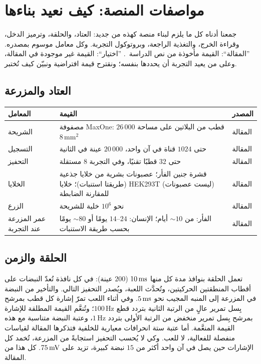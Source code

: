 \section{مواصفات المنصة: كيف نعيد بناءها}
\label{sec:dishspec}

جمعنا أدناه كل ما يلزم لبناء منصة كهذه من جديد: العتاد، والحلقة، وترميز الدخل، وقراءة الخرج، والتغذية الراجعة، وبروتوكول التجربة. وكل معامل موسوم بمصدره. ”المقالة“: القيمة مأخوذة من نص الدراسة~\cite{Kagan2022}. ”اختيار“: القيمة غير موجودة في المقالة، وعلى من يعيد التجربة أن يحددها بنفسه؛ ونقترح قيمة افتراضية ونبيّن كيف تُختبر.

\subsection*{العتاد والمزرعة}

\begin{center}
\footnotesize
\setlength{\tabcolsep}{4pt}
\renewcommand{\arraystretch}{1.15}
\begin{tabular}{>{\raggedright}p{4.0cm}>{\raggedright}p{6.9cm}>{\raggedright\arraybackslash}p{1.6cm}}
\toprule
المعامل & القيمة & المصدر \\
\midrule
الشريحة & مصفوفة \foreignlanguage{english}{MaxOne}: $26\,000$ قطب من البلاتين على مساحة $8\,\text{mm}^2$ & المقالة \\
التسجيل & حتى $1024$ قناة في آن واحد، $20\,000$ عينة في الثانية & المقالة \\
التحفيز & حتى $32$ قطبًا تقنيًا، وفي التجربة $8$ مستقلة & المقالة \\
الخلايا & قشرة جنين الفأر؛ عصبونات بشرية من خلايا جذعية (طريقتا استنبات)؛ خلايا \foreignlanguage{english}{HEK293T} (ليست عصبونات) للمقارنة الضابطة & المقالة \\
الزرع & نحو $10^6$ خلية للشريحة & المقالة \\
عمر المزرعة عند التجربة & الفأر: من $\sim10$ أيام؛ الإنسان: $14\text{--}24$ يومًا أو $\sim80$ يومًا بحسب طريقة الاستنبات & المقالة \\
\bottomrule
\end{tabular}
\end{center}

\subsection*{الحلقة والزمن}

تعمل الحلقة بنوافذ مدة كل منها $10\,\text{ms}$ ($200$ عينة): في كل نافذة تُعدّ النبضات على أقطاب المنطقتين الحركيتين، وتُحدَّث اللعبة، ويُصدر التحفيز التالي. والتأخير من النبضة في المزرعة إلى المنبه المجيب نحو $5\,\text{ms}$. وفي أثناء اللعب تمرّ إشارة كل قطب بمرشح بِسل تمرير عالٍ من الرتبة الثانية بتردد قطع $100\,\text{Hz}$؛ وتُنعَّم القيمة المطلقة للإشارة بمرشح بِسل تمرير منخفض من الرتبة الأولى بتردد $1\,\text{Hz}$، وعتبة النبضة متناسبة مع هذه القيمة المنعَّمة. أما عتبة ستة انحرافات معيارية للخلفية فتذكرها المقالة لقياسات منفصلة للفعالية، لا للعب. وكي لا يُحسب التحفيز استجابةً من المزرعة، تُخمد كل الإشارات حين يصل في آن واحد أكثر من $15$ نبضة كبيرة، تزيد على $75\,\text{mV}$. كل هذا من المقالة.

